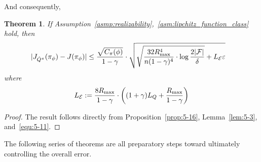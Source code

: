 \documentclass[twoside]{article}
\newtheorem{theorem}{Theorem}
\newcommand{\CAL}[1]{\mathcal{#1}}
\newcommand{\zyh}[1]{{\color{blue}{ [\textbf{Youheng:}} #1]}}
\begin{document}



And consequently,
\begin{theorem}\label{Thm:6.}
If Assumption~\ref{asmp:realizability},~\ref{asm:lipchitz_function_class} hold, then
    \begin{align}
        |J_{\hat{Q}^\pi}(\pi_\phi)&-J(\pi_\phi)|\leq\frac{\sqrt{C_\pi(\phi)}}{1-\gamma} \cdot
        \sqrt{\sqrt{\frac{32R_{\rm max}^4}{n(1-\gamma)^4}\cdot\log\frac{2|\mathcal{F}|}{\delta}}+L_\CAL{E}\varepsilon}
    \end{align}  
    where
    \begin{align}
        L_\CAL{E}:=\frac{8R_{\rm max}}{1-\gamma}\cdot\bigg((1+\gamma)L_Q+\frac{R_{\rm max}}{1-\gamma}\bigg)
    \end{align}
\end{theorem}
\begin{proof}
The result follows directly from Proposition~\ref{prop:5-16},  Lemma~\ref{lem:5-3}, and~\eqref{equ:5-11}.
\end{proof}

The following series of theorems are all preparatory steps toward ultimately controlling the overall error.

\end{document}
